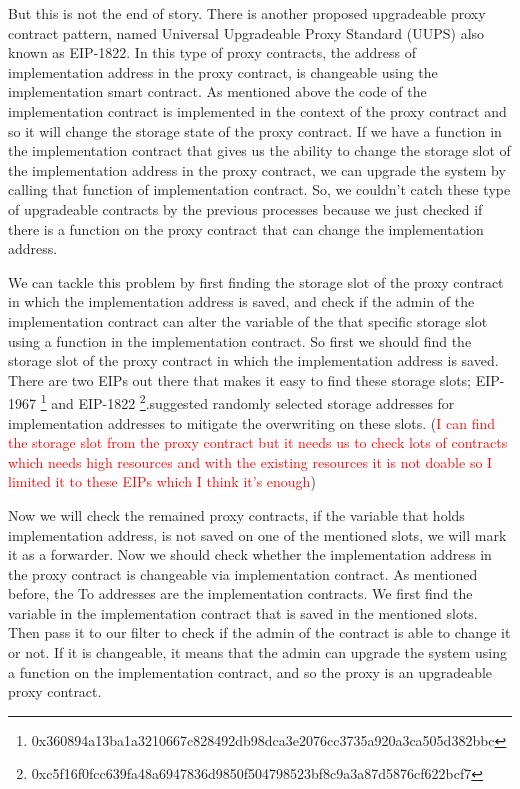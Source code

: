 But this is not the end of story. There is another proposed upgradeable proxy contract pattern, named Universal Upgradeable Proxy Standard (UUPS) also known as EIP-1822. In this type of proxy contracts, the address of implementation address in the proxy contract, is changeable using the implementation smart contract. As mentioned above the code of the implementation contract is implemented in the context of the proxy contract and so it will change the storage state of the proxy contract. If we have a function in the implementation contract that gives us the ability to change the storage slot of the implementation address in the proxy contract, we can upgrade the system by calling that function of implementation contract. So, we couldn't catch these type of upgradeable contracts by the previous processes because we just checked if there is a function on the proxy contract that can change the implementation address.

We can tackle this problem by first finding the storage slot of the proxy contract in which the implementation address is saved, and check if the admin of the implementation contract can alter the variable of the that specific storage slot using a function in the implementation contract. So first we should find the storage slot of the proxy contract in which the implementation address is saved. There are two EIPs out there that makes it easy to find these storage slots; EIP-1967 \footnote{0x360894a13ba1a3210667c828492db98dca3e2076cc3735a920a3ca505d382bbc} and EIP-1822 \footnote{0xc5f16f0fcc639fa48a6947836d9850f504798523bf8c9a3a87d5876cf622bcf7}.suggested randomly selected storage addresses for implementation addresses to mitigate the overwriting on these slots. (\textcolor{red}{I can find the storage slot from the proxy contract but it needs us to check lots of contracts which needs high resources and with the existing resources it is not doable so I limited it to these EIPs which I think it's enough})

Now we will check the remained proxy contracts, if the variable that holds implementation address, is not saved on one of the mentioned slots, we will mark it as a forwarder. Now we should check whether the implementation address in the proxy contract is changeable via implementation contract. As mentioned before, the To addresses are the implementation contracts. We first find the variable in the implementation contract that is saved in the mentioned slots. Then pass it to our filter to check if the admin of the contract is able to change it or not. If it is changeable, it means that the admin can upgrade the system using a function on the implementation contract, and so the proxy is an upgradeable proxy contract.

